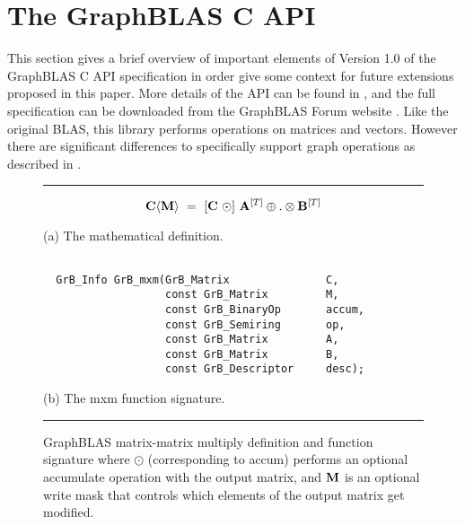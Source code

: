 %
%

\renewcommand{\vector}[1]{{\bf #1}}
\renewcommand{\matrix}[1]{{\bf #1}}

\section{The GraphBLAS C API}
\label{sec:GrBCspec}

This section gives a brief overview of important elements 
of Version 1.0 of the GraphBLAS C API specification in order give some context 
for future extensions proposed in this paper.  More details of the API can be 
found in \cite{graphblas_capi_17}, and the full specification can be downloaded 
from the GraphBLAS Forum website \cite{graphblas_web}.  Like the original BLAS, 
this library performs operations on matrices and vectors.  However there are 
significant differences to specifically support graph operations as described 
in \cite{mathgraphblas16}. 

\begin{figure}[b]
\hrule
\footnotesize
\[
\matrix{C}\langle \matrix{M} \rangle ~ = ~ [\matrix{C} ~\odot] ~ \matrix{A}^{[T]} \oplus.\otimes \matrix{B}^{[T]}
\]
\begin{center}(a) The mathematical definition.\end{center}

\begin{verbatim}

  GrB_Info GrB_mxm(GrB_Matrix               C,
                   const GrB_Matrix         M,  
                   const GrB_BinaryOp       accum,
                   const GrB_Semiring       op,
                   const GrB_Matrix         A, 
                   const GrB_Matrix         B,
                   const GrB_Descriptor     desc);
\end{verbatim}
\begin{center}(b) The {\sf mxm} function signature.\end{center}
\caption{GraphBLAS matrix-matrix multiply definition and function signature where 
$\odot$ (corresponding to {\sf accum}) performs an optional accumulate
operation with the output matrix, and $\matrix{M}$ is an optional write mask that
controls which elements of the output matrix get modified.\label{Fig:mxmfig}}
\hrule
\end{figure}

